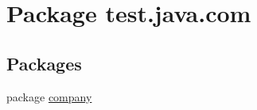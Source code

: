\hypertarget{namespacetest_1_1java_1_1com}{\section{Package test.\-java.\-com}
\label{namespacetest_1_1java_1_1com}
}
\subsection*{Packages}
\begin{DoxyCompactItemize}
\item 
package \hyperlink{namespacetest_1_1java_1_1com_1_1company}{company}
\end{DoxyCompactItemize}
